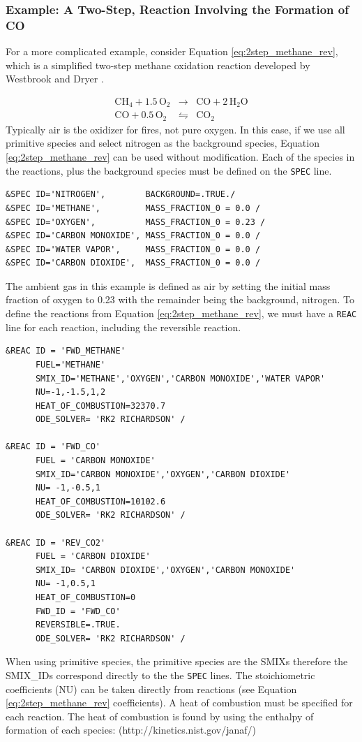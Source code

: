 \documentclass[11pt]{book}
\newcommand{\ct}{\tt\small}
\begin{document}
\subsubsection{Example: A Two-Step, Reaction Involving the Formation of CO}
For a more complicated example, consider Equation \ref{eq:2step_methane_rev}, which is a simplified two-step methane oxidation reaction developed by Westbrook and Dryer \cite{Westbrook:1}.

\begin{eqnarray}\label{eq:2step_methane_rev}
\mathrm{CH_4+1.5 \, O_2}&\rightarrow&  \mathrm{CO+2 \, H_2O} \\
\nonumber \mathrm{CO + 0.5 \, O_2} &\leftrightharpoons& \mathrm{CO_2}
\end{eqnarray}
Typically air is the oxidizer for fires, not pure oxygen. In this case, if we use all primitive species and select nitrogen as the background species, Equation \ref{eq:2step_methane_rev} can be used without modification. Each of the species in the reactions, plus the background species must be defined on the {\ct SPEC} line.
\footnotesize
\begin{verbatim}
&SPEC ID='NITROGEN',        BACKGROUND=.TRUE./
&SPEC ID='METHANE',         MASS_FRACTION_0 = 0.0 /
&SPEC ID='OXYGEN',          MASS_FRACTION_0 = 0.23 /
&SPEC ID='CARBON MONOXIDE', MASS_FRACTION_0 = 0.0 /
&SPEC ID='WATER VAPOR',     MASS_FRACTION_0 = 0.0 /
&SPEC ID='CARBON DIOXIDE',  MASS_FRACTION_0 = 0.0 /
\end{verbatim} \normalsize
The ambient gas in this example is defined as air by setting the initial mass fraction of oxygen to 0.23 with the remainder being the background, nitrogen. To define the reactions from Equation \ref{eq:2step_methane_rev}, we must have a {\ct REAC} line for each reaction, including the reversible reaction.
\footnotesize
\begin{verbatim}
&REAC ID = 'FWD_METHANE'
      FUEL='METHANE'
      SMIX_ID='METHANE','OXYGEN','CARBON MONOXIDE','WATER VAPOR'
      NU=-1,-1.5,1,2
      HEAT_OF_COMBUSTION=32370.7
      ODE_SOLVER= 'RK2 RICHARDSON' /

&REAC ID = 'FWD_CO'
      FUEL = 'CARBON MONOXIDE'
      SMIX_ID='CARBON MONOXIDE','OXYGEN','CARBON DIOXIDE'
      NU= -1,-0.5,1
      HEAT_OF_COMBUSTION=10102.6
      ODE_SOLVER= 'RK2 RICHARDSON' /

&REAC ID = 'REV_CO2'
      FUEL = 'CARBON DIOXIDE'
      SMIX_ID= 'CARBON DIOXIDE','OXYGEN','CARBON MONOXIDE'
      NU= -1,0.5,1
      HEAT_OF_COMBUSTION=0
      FWD_ID = 'FWD_CO'
      REVERSIBLE=.TRUE.
      ODE_SOLVER= 'RK2 RICHARDSON' /
\end{verbatim} \normalsize
When using primitive species, the primitive species are the SMIXs therefore the SMIX\_IDs correspond directly to the the {\ct SPEC} lines. The stoichiometric coefficients (NU) can be taken directly from reactions (see Equation \ref{eq:2step_methane_rev} coefficients). A heat of combustion must be specified for each reaction. The heat of combustion is found by using the enthalpy of formation of each species: (http://kinetics.nist.gov/janaf/)
\end{document}
